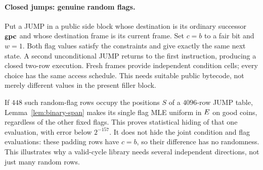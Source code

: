 \documentclass[11pt]{article}
\begin{document}
\paragraph{Closed jumps: genuine random flags.} Put a JUMP in a public side block whose destination is its ordinary successor $\mathsf{g}\mathbf{pc}$ and whose destination frame is its current frame. Set $c=b$ to a fair bit and $w=1$. Both flag values satisfy the constraints and give exactly the same next state. A second unconditional JUMP returns to the first instruction, producing a closed two-row execution. Fresh frames provide independent condition cells; every choice has the same access schedule. This needs suitable public bytecode, not merely different values in the present filler block.

If $448$ such random-flag rows occupy the positions $S$ of a $4096$-row JUMP table, Lemma~\ref{lem:binary-span} makes its single flag MLE uniform in $E$ on good coins, regardless of the other fixed flags. This proves statistical hiding of that one evaluation, with error below $2^{-157}$. It does not hide the joint condition and flag evaluations: these padding rows have $c=b$, so their difference has no randomness. This illustrates why a valid-cycle library needs several independent directions, not just many random rows.
\end{document}
